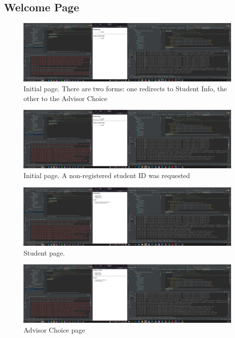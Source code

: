 \documentclass{article}
\begin{document}
\subsection*{Welcome Page}

\begin{figure}[h!]
    \centering
    \includegraphics[keepaspectratio,width=1\textwidth]{drawable/welcomePage.PNG}
    \caption{Initial page. There are two forms: one redirects to Student Info, the other to the Advisor Choice}
\end{figure}

\begin{figure}[h!]
    \centering
    \includegraphics[keepaspectratio,width=1\textwidth]{drawable/MatriculationDoNotExist.PNG}
    \caption{Initial page. A non-registered student ID was requested}
\end{figure}

\begin{figure}[h!]
    \centering
    \includegraphics[keepaspectratio,width=1\textwidth]{drawable/Test123.PNG}
    \caption{Student page.}
\end{figure}

\begin{figure}[h!]
    \centering
    \includegraphics[keepaspectratio,width=1\textwidth]{drawable/TestAdvisor123.PNG}
    \caption{Advisor Choice page}
\end{figure}
\end{document}
